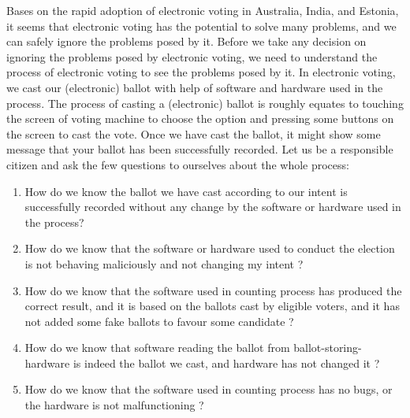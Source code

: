    
   Bases on the rapid adoption of electronic voting in Australia, India, and  Estonia, it seems that 
   electronic voting has 
   the potential to solve many problems, and we can safely 
   ignore the problems posed by it.
   Before we take any decision on ignoring the problems 
   posed by electronic voting,  we need to understand the process of electronic voting to see 
   the problems posed by it.  In electronic voting, we cast our (electronic) ballot with help 
   of software and hardware used in the process. The process of casting a (electronic) ballot is roughly
   equates to touching the screen of voting machine to choose the option and pressing some 
   buttons on the screen to cast the vote. Once we have cast the ballot, it might show some 
   message that your ballot has been successfully recorded.  Let us be a
   responsible citizen and ask the few questions to ourselves about the whole process:
   \begin{enumerate}
   \item How do we know the ballot we have cast according to our intent is successfully recorded 
   without any change by the software or hardware used in the process?
   \item How do we know that the software or hardware used to conduct the election is not 
   behaving maliciously and not  changing my intent ? 
   \item How do we know that the software used in counting process has produced the correct result, and it
   is based on the ballots cast by eligible voters, and it has not added  some fake ballots to favour 
   some candidate ?
   \item How do we know that software reading the ballot from ballot-storing-hardware 
    is indeed the ballot we cast, and hardware has not changed it ? 
   \item How do we know that the software used in counting process has no bugs, or the hardware is 
    not malfunctioning ? 
   \end{enumerate}
   
